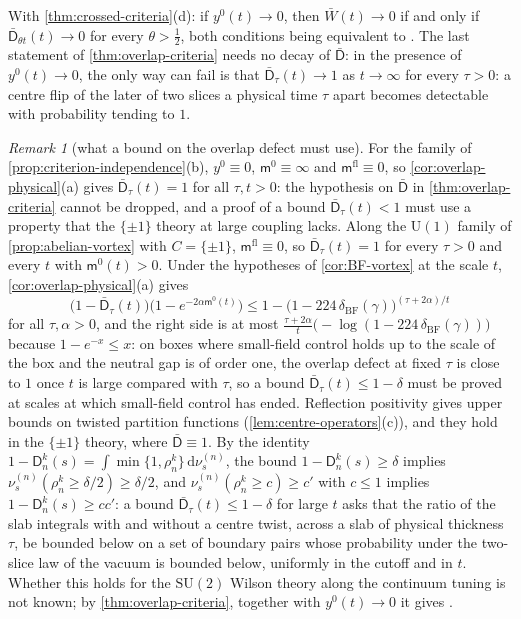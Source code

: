 \documentclass[11pt,a4paper]{amsart}
\theoremstyle{definition}
\theoremstyle{remark}
\newtheorem{remark}[theorem]{Remark}
\numberwithin{equation}{section}
\newcommand{\dd}{\,\mathrm{d}}             %
\newcommand{\SU}{\mathrm{SU}}              %
\newcommand{\U}{\mathrm{U}}                %
\newcommand{\Mcirc}{\text{\upshape(M$^{\circ}$)}}   %
\begin{document}
With \cref{thm:crossed-criteria}(d): if $y^0(t)\to0$, then $\bar W(t)\to0$ if and only if $\bar{\mathsf D}_{\theta t}(t)\to0$ for every $\theta>\frac12$, both conditions being equivalent to \Mcirc. The last statement of \cref{thm:overlap-criteria} needs no decay of $\bar{\mathsf D}$: in the presence of $y^0(t)\to0$, the only way \Mcirc{} can fail is that $\bar{\mathsf D}_\tau(t)\to1$ as $t\to\infty$ for every $\tau>0$: a centre flip of the later of two slices a physical time $\tau$ apart becomes detectable with probability tending to $1$.

\begin{remark}[what a bound on the overlap defect must use]\label{rem:overlap-obstructions}
For the family of \cref{prop:criterion-independence}(b), $y^0\equiv0$, $\mathsf m^0\equiv\infty$ and $\mathsf m^{\mathrm{fl}}\equiv0$, so \cref{cor:overlap-physical}(a) gives $\bar{\mathsf D}_\tau(t)=1$ for all $\tau,t>0$: the hypothesis on $\bar{\mathsf D}$ in \cref{thm:overlap-criteria} cannot be dropped, and a proof of a bound $\bar{\mathsf D}_\tau(t)<1$ must use a property that the $\{\pm1\}$ theory at large coupling lacks. Along the $\U(1)$ family of \cref{prop:abelian-vortex} with $C=\{\pm1\}$, $\mathsf m^{\mathrm{fl}}\equiv0$, so $\bar{\mathsf D}_\tau(t)=1$ for every $\tau>0$ and every $t$ with $\mathsf m^0(t)>0$. Under the hypotheses of \cref{cor:BF-vortex} at the scale $t$, \cref{cor:overlap-physical}(a) gives
\[
\bigl(1-\bar{\mathsf D}_\tau(t)\bigr)\bigl(1-e^{-2\alpha\mathsf m^0(t)}\bigr)\le1-\bigl(1-224\,\delta_{\mathrm{BF}}(\gamma)\bigr)^{(\tau+2\alpha)/t}
\]
for all $\tau,\alpha>0$, and the right side is at most $\frac{\tau+2\alpha}t\bigl(-\log(1-224\,\delta_{\mathrm{BF}}(\gamma))\bigr)$ because $1-e^{-x}\le x$: on boxes where small-field control holds up to the scale of the box and the neutral gap is of order one, the overlap defect at fixed $\tau$ is close to $1$ once $t$ is large compared with $\tau$, so a bound $\bar{\mathsf D}_\tau(t)\le1-\delta$ must be proved at scales at which small-field control has ended. Reflection positivity gives upper bounds on twisted partition functions (\cref{lem:centre-operators}(c)), and they hold in the $\{\pm1\}$ theory, where $\bar{\mathsf D}\equiv1$. By the identity $1-\mathsf D^k_n(s)=\int\min\{1,\rho^k_n\}\dd\nu^{(n)}_s$, the bound $1-\mathsf D^k_n(s)\ge\delta$ implies $\nu^{(n)}_s(\rho^k_n\ge\delta/2)\ge\delta/2$, and $\nu^{(n)}_s(\rho^k_n\ge c)\ge c'$ with $c\le1$ implies $1-\mathsf D^k_n(s)\ge cc'$: a bound $\bar{\mathsf D}_\tau(t)\le1-\delta$ for large $t$ asks that the ratio of the slab integrals with and without a centre twist, across a slab of physical thickness $\tau$, be bounded below on a set of boundary pairs whose probability under the two-slice law of the vacuum is bounded below, uniformly in the cutoff and in $t$. Whether this holds for the $\SU(2)$ Wilson theory along the continuum tuning is not known; by \cref{thm:overlap-criteria}, together with $y^0(t)\to0$ it gives \Mcirc{}.
\end{remark}
\end{document}
